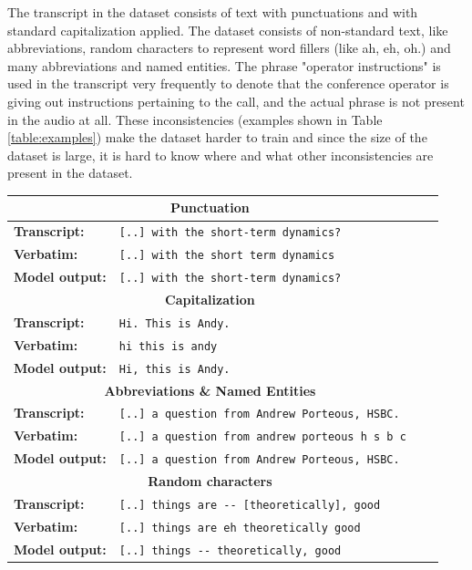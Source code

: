 The transcript in the dataset consists of text with punctuations and with standard capitalization applied. The dataset consists of non-standard text, like abbreviations, random characters to represent word fillers (like ah, eh, oh.) and many abbreviations and named entities. The phrase "operator instructions" is used in the transcript very frequently to denote that the conference operator is giving out instructions pertaining to the call, and the actual phrase is not present in the audio at all. These inconsistencies (examples shown in Table \ref{table:examples}) make the dataset harder to train and since the size of the dataset is large, it is hard to know where and what other inconsistencies are present in the dataset. 

\begin{table}[ht]
\begin{tabular}{ l p{9.6cm} c c }

 \hline
 \multicolumn{2}{c}{\textbf{Punctuation}} \\
 \hline
 \textbf{Transcript:} & \verb|[..] with the short-term dynamics?| \\ 
 \textbf{Verbatim:} & \verb|[..] with the short term dynamics| \\
 \textbf{Model output:} & \verb|[..] with the short-term dynamics?| \\
 \hline\hline

 \multicolumn{2}{c}{\textbf{Capitalization}} \\
 \hline
 \textbf{Transcript:} & \verb|Hi. This is Andy.| \\ 
 \textbf{Verbatim:} & \verb|hi this is andy| \\
 \textbf{Model output:} & \verb|Hi, this is Andy.| \\
 \hline\hline
 
 \multicolumn{2}{c}{\textbf{Abbreviations \& Named Entities}} \\
 \hline
 \textbf{Transcript:} & \verb|[..] a question from Andrew Porteous, HSBC.| \\ 
 \textbf{Verbatim:} & \verb|[..] a question from andrew porteous h s b c| \\
 \textbf{Model output:} & \verb|[..] a question from Andrew Porteous, HSBC.| \\
 \hline\hline
 
 \multicolumn{2}{c}{\textbf{Random characters}} \\
 \hline
 \textbf{Transcript:} & \verb|[..] things are -- [theoretically], good| \\ 
 \textbf{Verbatim:} & \verb|[..] things are eh theoretically good| \\
 \textbf{Model output:} & \verb|[..] things -- theoretically, good| \\
 \hline\hline
 

\end{tabular}
\end{table}
